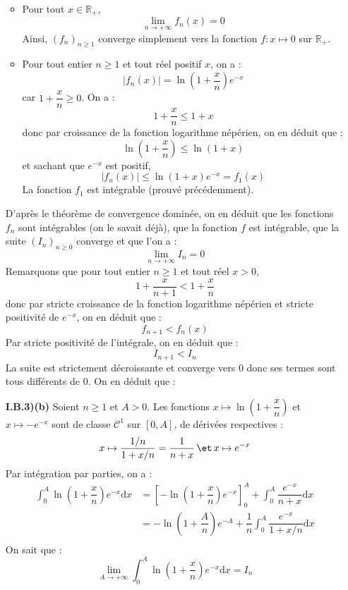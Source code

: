 \documentclass[a4paper,twoside,french,10pt]{VcCours}
\newcommand{\dx}{\text{d}x}
\newcommand{\enc}[1]{\begin{center}\fbox{#1}\end{center}}
\begin{document}
\begin{enumerate}
\begin{itemize}
\item Pour tout $x \in \mathbb{R}_+$,
$$ \lim_{n \rightarrow + \infty} f_n(x) = 0$$
Ainsi, $(f_n)_{n \geq 1}$ converge simplement vers la fonction $ f : x \mapsto 0$ sur $\mathbb{R}_+$.
\item Pour tout entier $n \geq 1$ et tout réel positif $x$, on a :
$$ \vert f_n(x) \vert = \ln \left(1+ \dfrac{x}{n} \right) e^{-x}$$
car $1+ \dfrac{x}{n} \geq 0$. On a :
$$1 + \dfrac{x}{n} \leq 1+x$$
donc par croissance de la fonction logarithme népérien, on en déduit que :
$$ \ln \left(1+ \dfrac{x}{n} \right) \leq \ln(1+x)$$
et sachant que $e^{-x}$ est positif,
$$ \vert f_n(x) \vert \leq \ln(1+x) e^{-x} = f_1(x)$$
La fonction $f_1$ est intégrable (prouvé précédemment).
\end{itemize}
D'après le théorème de convergence dominée, on en déduit que les fonctions $f_n$ sont intégrables (on le savait déjà), que la fonction $f$ est intégrable, que la suite $(I_n)_{n \geq 0}$ converge et que l'on a :
$$ \lim_{n \rightarrow + \infty} I_n =0$$
%
Remarquons que pour tout entier $n \geq 1$ et tout réel $x > 0$,
$$ 1+ \dfrac{x}{n+1} < 1 + \dfrac{x}{n}$$
donc par stricte croissance de la fonction logarithme népérien et stricte positivité de $e^{-x}$, on en déduit que :
$$ f_{n+1} < f_n(x)$$
Par stricte positivité de l'intégrale, on en déduit que :
$$ I_{n+1} < I_n$$
La suite est strictement décroissante et converge vers $0$ donc ses termes sont tous différents de $0$. On en déduit que :
\enc{$(I_n)_{n \geq 0}$ appartient à $E$}
 \item[\textbf{I.B.3)(b)}] Soient $n \geq 1$ et $A>0$. Les fonctions $x \mapsto \ln \left(1+ \dfrac{x}{n}\right)$ et $x \mapsto - e^{-x}$ sont de classe $\mathcal{C}^1$ sur $[0,A]$, de dérivées respectives :
$$ x \mapsto \dfrac{1/n}{1+x/n} = \dfrac{1}{n+x} \, \et \, x \mapsto e^{-x}$$
Par intégration par parties, on a :
\begin{align*}
\int_0^A \ln \left(1+ \dfrac{x}{n}\right) e^{-x} \dx & = \left[ - \ln \left(1+ \dfrac{x}{n}\right) e^{-x} \right]_0^A + \int_0^A  \dfrac{e^{-x}}{n+x} \dx \\
& = - \ln \left(1+ \dfrac{A}{n}\right) e^{-A}  + \dfrac{1}{n} \int_0^A  \dfrac{e^{-x}}{1+x/n} \dx \\
\end{align*}
On sait que :
$$ \lim_{A \rightarrow + \infty}\int_0^A \ln \left(1+ \dfrac{x}{n}\right) e^{-x} \dx = I_n$$

\end{enumerate}
\end{document}
